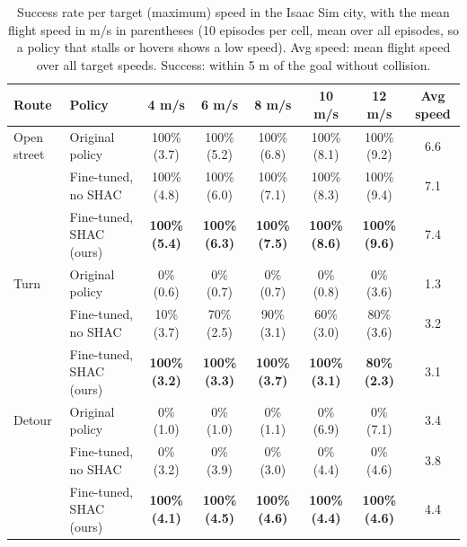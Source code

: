 \begin{table}[t]
\centering
\small
\caption{Success rate per target (maximum) speed in the Isaac Sim city, with the mean flight speed in m/s in parentheses (10 episodes per cell, mean over all episodes, so a policy that stalls or hovers shows a low speed). Avg speed: mean flight speed over all target speeds. Success: within 5 m of the goal without collision.}
\label{tab:speed}
\begin{tabular}{llcccccc}
\toprule
Route & Policy & 4 m/s & 6 m/s & 8 m/s & 10 m/s & 12 m/s & Avg speed \\
\midrule
Open street & Original policy & 100\% (3.7) & 100\% (5.2) & 100\% (6.8) & 100\% (8.1) & 100\% (9.2) & 6.6 \\
 & Fine-tuned, no SHAC & 100\% (4.8) & 100\% (6.0) & 100\% (7.1) & 100\% (8.3) & 100\% (9.4) & 7.1 \\
 & Fine-tuned, SHAC (ours) & \textbf{100\% (5.4)} & \textbf{100\% (6.3)} & \textbf{100\% (7.5)} & \textbf{100\% (8.6)} & \textbf{100\% (9.6)} & 7.4 \\
\midrule
Turn & Original policy & 0\% (0.6) & 0\% (0.7) & 0\% (0.7) & 0\% (0.8) & 0\% (3.6) & 1.3 \\
 & Fine-tuned, no SHAC & 10\% (3.7) & 70\% (2.5) & 90\% (3.1) & 60\% (3.0) & 80\% (3.6) & 3.2 \\
 & Fine-tuned, SHAC (ours) & \textbf{100\% (3.2)} & \textbf{100\% (3.3)} & \textbf{100\% (3.7)} & \textbf{100\% (3.1)} & \textbf{80\% (2.3)} & 3.1 \\
\midrule
Detour & Original policy & 0\% (1.0) & 0\% (1.0) & 0\% (1.1) & 0\% (6.9) & 0\% (7.1) & 3.4 \\
 & Fine-tuned, no SHAC & 0\% (3.2) & 0\% (3.9) & 0\% (3.0) & 0\% (4.4) & 0\% (4.6) & 3.8 \\
 & Fine-tuned, SHAC (ours) & \textbf{100\% (4.1)} & \textbf{100\% (4.5)} & \textbf{100\% (4.6)} & \textbf{100\% (4.4)} & \textbf{100\% (4.6)} & 4.4 \\
\bottomrule
\end{tabular}
\end{table}
